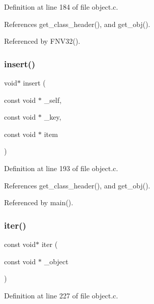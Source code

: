 Definition at line 184 of file object.\+c.



References get\+\_\+class\+\_\+header(), and get\+\_\+obj().



Referenced by F\+N\+V32().

\mbox{\label{group__collection_gaa1b700b0fbad0b56b81291260569d8b2}} 
\subsubsection{\texorpdfstring{insert()}{insert()}}
{\footnotesize\ttfamily void$\ast$ insert (\begin{DoxyParamCaption}\item[{const void $\ast$}]{\+\_\+self,  }\item[{const void $\ast$}]{\+\_\+key,  }\item[{const void $\ast$}]{item }\end{DoxyParamCaption})}



Definition at line 193 of file object.\+c.



References get\+\_\+class\+\_\+header(), and get\+\_\+obj().



Referenced by main().

\mbox{\label{group__collection_ga0cb67414335937707c9b92809a10895b}} 
\subsubsection{\texorpdfstring{iter()}{iter()}}
{\footnotesize\ttfamily const void$\ast$ iter (\begin{DoxyParamCaption}\item[{const void $\ast$}]{\+\_\+object }\end{DoxyParamCaption})}



Definition at line 227 of file object.\+c.



